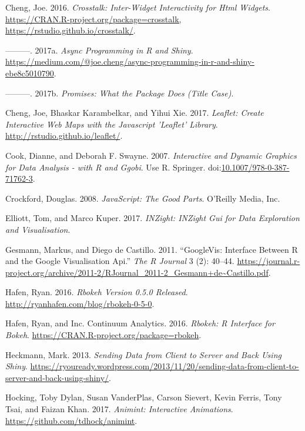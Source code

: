 \documentclass[11pt,]{report}
\begin{document}
\hypertarget{ref-cheng16}{}
Cheng, Joe. 2016. \emph{Crosstalk: Inter-Widget Interactivity for Html
Widgets}.
\href{https://CRAN.R-project.org/package=crosstalk,\%20https://rstudio.github.io/crosstalk/}{https://CRAN.R-project.org/package=crosstalk, https://rstudio.github.io/crosstalk/}.

\hypertarget{ref-promise02}{}
---------. 2017a. \emph{Async Programming in R and Shiny}.
\url{https://medium.com/@joe.cheng/async-programming-in-r-and-shiny-ebe8c5010790}.

\hypertarget{ref-promise01}{}
---------. 2017b. \emph{Promises: What the Package Does (Title Case)}.

\hypertarget{ref-leaf01}{}
Cheng, Joe, Bhaskar Karambelkar, and Yihui Xie. 2017. \emph{Leaflet:
Create Interactive Web Maps with the Javascript 'Leaflet' Library}.
\url{http://rstudio.github.io/leaflet/}.

\hypertarget{ref-cosway07}{}
Cook, Dianne, and Deborah F. Swayne. 2007. \emph{Interactive and Dynamic
Graphics for Data Analysis - with R and Ggobi}. Use R. Springer.
doi:\href{https://doi.org/10.1007/978-0-387-71762-3}{10.1007/978-0-387-71762-3}.

\hypertarget{ref-crockford01}{}
Crockford, Douglas. 2008. \emph{JavaScript: The Good Parts}. O'Reilly
Media, Inc.

\hypertarget{ref-inz01}{}
Elliott, Tom, and Marco Kuper. 2017. \emph{INZight: INZight Gui for Data
Exploration and Visualisation}.

\hypertarget{ref-gesman01}{}
Gesmann, Markus, and Diego de Castillo. 2011. ``GoogleVis: Interface
Between R and the Google Visualisation Api.'' \emph{The R Journal} 3
(2): 40--44.
\url{https://journal.r-project.org/archive/2011-2/RJournal_2011-2_Gesmann+de~Castillo.pdf}.

\hypertarget{ref-hafen02}{}
Hafen, Ryan. 2016. \emph{Rbokeh Version 0.5.0 Released}.
\url{http://ryanhafen.com/blog/rbokeh-0-5-0}.

\hypertarget{ref-hafen01}{}
Hafen, Ryan, and Inc. Continuum Analytics. 2016. \emph{Rbokeh: R
Interface for Bokeh}. \url{https://CRAN.R-project.org/package=rbokeh}.

\hypertarget{ref-heckmann01}{}
Heckmann, Mark. 2013. \emph{Sending Data from Client to Server and Back
Using Shiny}.
\url{https://ryouready.wordpress.com/2013/11/20/sending-data-from-client-to-server-and-back-using-shiny/}.

\hypertarget{ref-animint01}{}
Hocking, Toby Dylan, Susan VanderPlas, Carson Sievert, Kevin Ferris,
Tony Tsai, and Faizan Khan. 2017. \emph{Animint: Interactive
Animations}. \url{https://github.com/tdhock/animint}.
\end{document}
